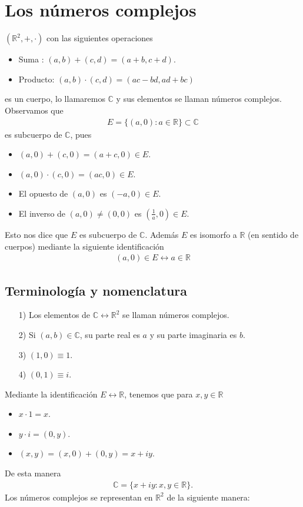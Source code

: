 \chapter{Los números complejos}
$(\mathbb{R}^2, +, \cdot)$ con las siguientes operaciones
\begin{itemize}
    \item Suma : $(a,b) + (c,d) = (a + b, c + d)$.
    \item Producto: $(a,b) \cdot (c,d) = (ac - bd, ad + bc)$
\end{itemize}
es un cuerpo, lo llamaremos $\mathbb{C}$ y sus elementos se llaman números complejos.
\\
\newline
Observamos que 
\begin{align*}
    E = \{ (a,0) : a \in \mathbb{R} \} \subset \mathbb{C}
\end{align*}
es subcuerpo de $\mathbb{C}$, pues 
\begin{itemize}
    \item $(a,0) + (c,0) = (a+c,0) \in E$.
    \item $(a,0) \cdot (c,0) = (ac,0) \in E$.
    \item El opuesto de $(a,0)$ es $(-a,0) \in E$.
    \item El inverso de $(a,0) \not = (0,0)$ es $\left(\frac{1}{a},0\right) \in E$.
\end{itemize}
Esto nos dice que $E$ es subcuerpo de $\mathbb{C}$. Además $E$ es isomorfo a $\mathbb{R}$ (en sentido de cuerpos) mediante la siguiente identificación
\begin{align*}
    (a,0) \in E \longleftrightarrow a \in \mathbb{R}
\end{align*}
\section{Terminología y nomenclatura}
\begin{enumerate}
    \item[1)] Los elementos de $\mathbb{C} \longleftrightarrow \mathbb{R}^2$ se llaman números complejos.
    \item[2)] Si $(a,b) \in \mathbb{C}$, su parte real es $a$ y su parte imaginaria es $b$.
    \item[3)] $(1,0) \equiv 1$.
    \item[4)] $(0,1) \equiv i$.
\end{enumerate}
Mediante la identificación $E \longleftrightarrow \mathbb{R}$, tenemos que para $x,y \in \mathbb{R}$
\begin{itemize}
    \item $x \cdot 1 = x$.
    \item $y \cdot i = (0,y)$.
    \item $(x,y) = (x,0) + (0,y) = x + iy$.
\end{itemize}
De esta manera
\begin{align*}
    \mathbb{C} = \{ x + iy : x,y \in \mathbb{R} \}.
\end{align*}
Los números complejos se representan en $\mathbb{R}^2$ de la siguiente manera:

